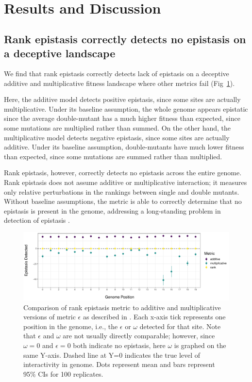 \section{Results and Discussion}


\subsection{Rank epistasis correctly detects no epistasis on a deceptive landscape}

We find that rank epistasis correctly detects lack of epistasis on a deceptive additive and multiplicative fitness landscape where other metrics fail (Fig~\ref{fig:res:addmult}). 

Here, the additive model detects positive epistasis, since some sites are actually multiplicative. Under its baseline assumption, the whole genome appears epistatic since the average double-mutant has a much higher fitness than expected, since some mutations are multiplied rather than summed. On the other hand, the multiplicative model detects negative epistasis, since some sites are actually additive. Under its baseline assumption, double-mutants have much lower fitness than expected, since some mutations are summed rather than multiplied.

Rank epistasis, however, correctly detects no epistasis across the entire genome. Rank epistasis does not assume additive or multiplicative interaction; it measures only relative perturbations in the rankings between single and double mutants. Without baseline assumptions, the metric is able to correctly determine that no epistasis is present in the genome, addressing a long-standing problem in detection of epistasis \citep{cordell_epistasis_2002, puniyani_meaning_2004}. 

\begin{figure}
    \centering
    \includegraphics[width=\textwidth]{chapters/1-rank-epistasis/figs/summary_addmult.pdf}
    \caption{Comparison of rank epistasis metric to additive and multiplicative versions of metric $\epsilon$ as described in \cite{ostman_impact_2011}. Each x-axis tick represents one position in the genome, i.e., the $\epsilon$ or $\omega$ detected for that site. Note that $\epsilon$ and $\omega$ are not usually directly comparable; however, since $\omega=0$ and $\epsilon=0$ both indicate no epistasis, here $\omega$ is graphed on the same Y-axis. Dashed line at Y=0 indicates the true level of interactivity in genome. Dots represent mean and bars represent 95\% CIs for 100 replicates.}
    \label{fig:res:addmult}
\end{figure}

